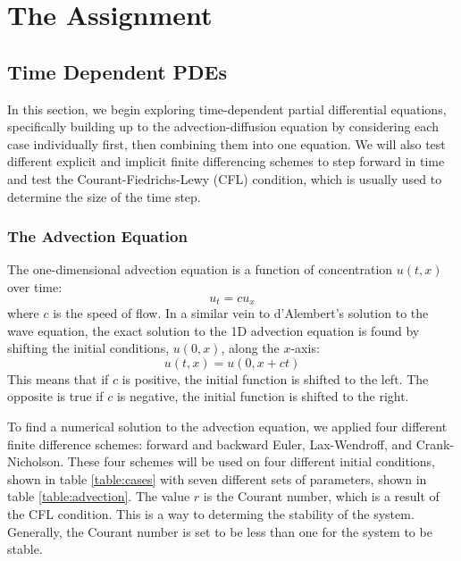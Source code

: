 \documentclass[twocolumn]{article}
\begin{document}
\section{The Assignment}

\subsection{Time Dependent PDEs}

In this section, we begin exploring time-dependent partial
differential equations, specifically building up to the
advection-diffusion equation by considering each case individually
first, then combining them into one equation. We will also test
different explicit and implicit finite differencing schemes to step
forward in time and test the Courant-Fiedrichs-Lewy (CFL) condition,
which is usually used to determine the size of the time step.

\subsubsection{The Advection Equation}

The one-dimensional advection equation is a function of
concentration $u(t, x)$ over time:
\begin{equation}
  u_t = c u_x
\end{equation}
where $c$ is the speed of flow. In a similar vein to d'Alembert's
solution to the wave equation, the exact solution to the 1D advection
equation is found by shifting the initial conditions, $u(0, x)$, along
the $x$-axis:
\begin{equation}
  u(t, x) = u(0, x + ct)
\end{equation}
This means that if $c$ is positive, the initial function is shifted to
the left. The opposite is true if $c$ is negative, the initial
function is shifted to the right.

To find a numerical solution to the advection equation, we applied
four different finite difference schemes: forward and backward Euler,
Lax-Wendroff, and Crank-Nicholson. These four schemes will be used on
four different initial conditions, shown in table \ref{table:cases}
with seven different sets of parameters, shown in table
\ref{table:advection}. The value $r$ is the Courant number, which is a
result of the CFL condition. This is a way to determing the stability
of the system. Generally, the Courant number is set to be less than
one for the system to be stable.
\end{document}
